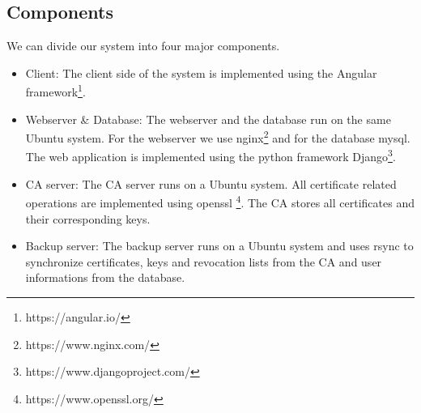 \documentclass[english]{article}
\begin{document}









\subsection{Components}

We can divide our system into four major components.
\begin{itemize}
\item Client: The client side of the system is implemented using the Angular framework\footnote{https://angular.io/}.
\item Webserver \& Database: The webserver and the database run on the same Ubuntu system. For the webserver we use nginx\footnote{https://www.nginx.com/} and for the database mysql. The web application is implemented using the python framework Django\footnote{https://www.djangoproject.com/}.
\item CA server: The CA server runs on a Ubuntu system. All certificate related operations are implemented using openssl \footnote{https://www.openssl.org/}. The CA stores all certificates and their corresponding keys.
\item Backup server: The backup server runs on a Ubuntu system and uses rsync to synchronize certificates, keys and revocation lists from the CA and user informations from the database.
\end{itemize}

  
\end{document}
